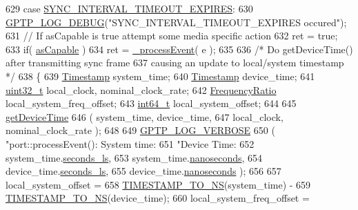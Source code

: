 \begin{DoxyCode}
629     \textcolor{keywordflow}{case} \hyperlink{ieee1588_8hpp_a5667b805d857c6d28f83f6038a0272d3a3dba953a3ff5fdac319eca872a7fbc87}{SYNC\_INTERVAL\_TIMEOUT\_EXPIRES}:
630         \hyperlink{gptp__log_8hpp_ae4c6efe7c9cf6d7d3bbd28a0fd087d61}{GPTP\_LOG\_DEBUG}(\textcolor{stringliteral}{"SYNC\_INTERVAL\_TIMEOUT\_EXPIRES occured"});
631         \textcolor{comment}{// If asCapable is true attempt some media specific action}
632         ret = \textcolor{keyword}{true};
633         \textcolor{keywordflow}{if}( \hyperlink{class_common_port_a15a09cf240fb37b905e4d4e1e9f5b9a1}{asCapable} )
634             ret = \hyperlink{class_common_port_a8fdf705ad3f9d8794555fe1c611c19ec}{\_processEvent}( e );
635 
636         \textcolor{comment}{/* Do getDeviceTime() after transmitting sync frame}
637 \textcolor{comment}{           causing an update to local/system timestamp */}
638         \{
639             \hyperlink{class_timestamp}{Timestamp} system\_time;
640             \hyperlink{class_timestamp}{Timestamp} device\_time;
641             \hyperlink{parse_8c_a6eb1e68cc391dd753bc8ce896dbb8315}{uint32\_t} local\_clock, nominal\_clock\_rate;
642             \hyperlink{ptptypes_8hpp_a84de47dc2ed889ecd2b61706d3ad0f2e}{FrequencyRatio} local\_system\_freq\_offset;
643             \hyperlink{parse_8c_a67a9885ef4908cb72ce26d75b694386c}{int64\_t} local\_system\_offset;
644 
645             \hyperlink{class_common_port_a16ab03ee31d5e246f05098d1e89f2537}{getDeviceTime}
646                 ( system\_time, device\_time,
647                   local\_clock, nominal\_clock\_rate );
648 
649             \hyperlink{gptp__log_8hpp_add03384a2a8099b27e07d041cce77e6f}{GPTP\_LOG\_VERBOSE}
650                 ( \textcolor{stringliteral}{"port::processEvent(): System time: %
651                   \textcolor{stringliteral}{"Device Time: %
652                   system\_time.\hyperlink{class_timestamp_a2bf200e58cd268d8b86cf93c51500a44}{seconds\_ls},
653                   system\_time.\hyperlink{class_timestamp_a78ae11d98fcfe738239d0a853d82c84a}{nanoseconds},
654                   device\_time.\hyperlink{class_timestamp_a2bf200e58cd268d8b86cf93c51500a44}{seconds\_ls},
655                   device\_time.\hyperlink{class_timestamp_a78ae11d98fcfe738239d0a853d82c84a}{nanoseconds} );
656 
657             local\_system\_offset =
658                 \hyperlink{ieee1588_8hpp_a0f6cecd8adce4a7314f084f3ead49999}{TIMESTAMP\_TO\_NS}(system\_time) -
659                 \hyperlink{ieee1588_8hpp_a0f6cecd8adce4a7314f084f3ead49999}{TIMESTAMP\_TO\_NS}(device\_time);
660             local\_system\_freq\_offset =
}}
\end{DoxyCode}
